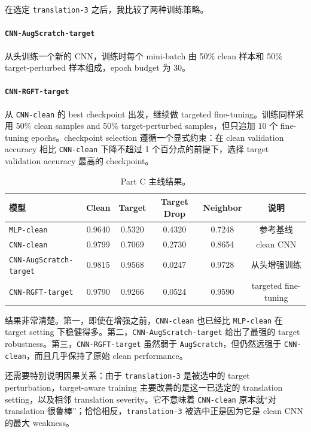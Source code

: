 \documentclass[12pt,a4paper,fontset=fandol]{ctexart}
\begin{document}
在选定 \texttt{translation-3} 之后，我比较了两种训练策略。

\paragraph{\texttt{CNN-AugScratch-target}}
从头训练一个新的 CNN，训练时每个 mini-batch 由 50\% clean 样本和 50\% target-perturbed 样本组成，epoch budget 为 30。

\paragraph{\texttt{CNN-RGFT-target}}
从 \texttt{CNN-clean} 的 best checkpoint 出发，继续做 targeted fine-tuning。训练同样采用 50\% clean samples and 50\% target-perturbed samples，但只追加 10 个 fine-tuning epochs。checkpoint selection 遵循一个显式约束：在 clean validation accuracy 相比 \texttt{CNN-clean} 下降不超过 1 个百分点的前提下，选择 target validation accuracy 最高的 checkpoint。

\begin{table}[H]
  \centering
  \small
  \caption{Part C 主线结果。}
  \renewcommand{\arraystretch}{1.08}
  \begin{tabular}{lccccc}
    \toprule
    模型 & Clean & Target & Target Drop & Neighbor & 说明 \\
    \midrule
    \texttt{MLP-clean} & 0.9640 & 0.5320 & 0.4320 & 0.7248 & 参考基线 \\
    \texttt{CNN-clean} & 0.9799 & 0.7069 & 0.2730 & 0.8654 & clean CNN \\
    \texttt{CNN-AugScratch-target} & 0.9815 & 0.9568 & 0.0247 & 0.9728 & 从头增强训练 \\
    \texttt{CNN-RGFT-target} & 0.9790 & 0.9266 & 0.0524 & 0.9590 & targeted fine-tuning \\
    \bottomrule
  \end{tabular}
\end{table}

结果非常清楚。第一，即使在增强之前，\texttt{CNN-clean} 也已经比 \texttt{MLP-clean} 在 target setting 下稳健得多。第二，\texttt{CNN-AugScratch-target} 给出了最强的 target robustness。第三，\texttt{CNN-RGFT-target} 虽然弱于 \texttt{AugScratch}，但仍然远强于 \texttt{CNN-clean}，而且几乎保持了原始 clean performance。

还需要特别说明因果关系：由于 \texttt{translation-3} 是被选中的 target perturbation，target-aware training 主要改善的是这一已选定的 translation setting，以及相邻 translation severity。它不意味着 \texttt{CNN-clean} 原本就“对 translation 很鲁棒”；恰恰相反，\texttt{translation-3} 被选中正是因为它是 clean CNN 的最大 weakness。
\end{document}
